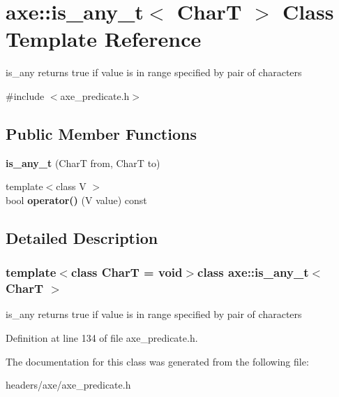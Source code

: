 \hypertarget{classaxe_1_1is__any__t}{\section{axe\+:\+:is\+\_\+any\+\_\+t$<$ Char\+T $>$ Class Template Reference}
\label{classaxe_1_1is__any__t}
}


is\+\_\+any returns true if value is in range specified by pair of characters  




{\ttfamily \#include $<$axe\+\_\+predicate.\+h$>$}

\subsection*{Public Member Functions}
\begin{DoxyCompactItemize}
\item 
\hypertarget{classaxe_1_1is__any__t_a0e4a1d33b25dc61f3b54b8963eea21a8}{{\bfseries is\+\_\+any\+\_\+t} (Char\+T from, Char\+T to)}\label{classaxe_1_1is__any__t_a0e4a1d33b25dc61f3b54b8963eea21a8}

\item 
\hypertarget{classaxe_1_1is__any__t_acb2267583b8b3f825528f646478fc65e}{{\footnotesize template$<$class V $>$ }\\bool {\bfseries operator()} (V value) const }\label{classaxe_1_1is__any__t_acb2267583b8b3f825528f646478fc65e}

\end{DoxyCompactItemize}


\subsection{Detailed Description}
\subsubsection*{template$<$class Char\+T = void$>$class axe\+::is\+\_\+any\+\_\+t$<$ Char\+T $>$}

is\+\_\+any returns true if value is in range specified by pair of characters 

Definition at line 134 of file axe\+\_\+predicate.\+h.



The documentation for this class was generated from the following file\+:\begin{DoxyCompactItemize}
\item 
headers/axe/axe\+\_\+predicate.\+h\end{DoxyCompactItemize}
